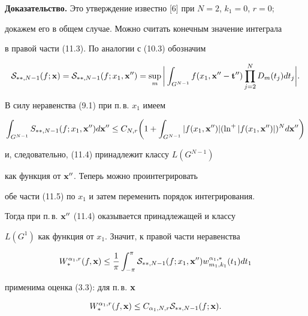 {\bf Доказательство.} Это утверждение известно [6] при $N=2$, $k_1=0$, $r=0$;


докажем его в общем случае. Можно считать конечным значение интеграла


в правой части (11.3). По аналогии с (10.3) обозначим


\begin{equation}


{\cal S}_{**,N-1}(f;{\bold x})={\cal S}_{**,N-1}(f;x_1,{\bold x}'')=


\sup_{m}\bigg|\int_{G^{N-1}}f(x_1,{\bold x}''-{\bold t}'')\prod_{j=2}^N


D_m(t_j)dt_j\bigg|.


\end{equation}


В силу неравенства (9.1) при п.\,в. $x_1$ имеем


\begin{equation}


\int_{G^{N-1}} S_{**,N-1}(f;x_1,{\bold x}'') d{\bold x}''\le C_{N,r}


\bigg(1+\int_{G^{N-1}}|f(x_1,{\bold x}'')|(\ln^+ |f(x_1,


{\bold x}'')|)^{N}d{\bold x}''\bigg)


\end{equation}


и, следовательно, (11.4) принадлежит классу $L(G^{N-1})$


как функция от ${\bold x}''$. Теперь можно проинтегрировать 


обе части (11.5) по $x_1$ и затем переменить порядок интегрирования.


Тогда при п.\,в. ${\bold x}''$ (11.4) оказывается принадлежащей и классу


$L(G^{1})$ как функция от $x_1$. Значит, к правой части неравенства


$$


W_{*}^{\alpha_1,r} (f,{\bold x})\le


\frac {1}{\pi}\int_{-\pi}^\pi


{\cal S}_{**,N-1}(f;x_1,{\bold x}'')w_{m_1,k_1}^{\alpha_1,*}(t_1)dt_1


$$


применима оценка (3.3): для п.\,в. ${\bold x}$


\begin{equation}


W_{*}^{\alpha_1,r} (f,{\bold x})\le C_{\alpha_1,N,r} 


{\cal S}_{**,N-1}(f;{\bold x}).


\end{equation}


